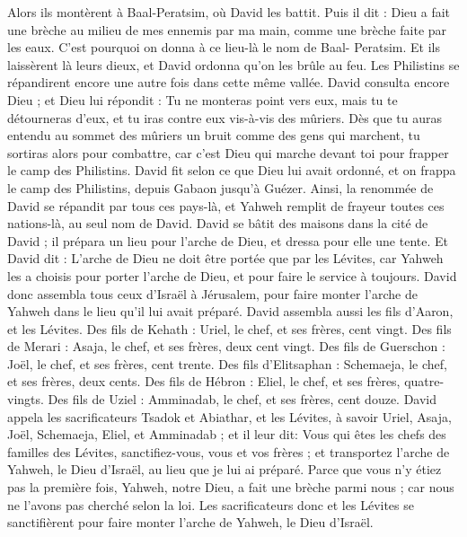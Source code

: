\begin{multicols}{2}
Alors ils montèrent à Baal-Peratsim, où David les battit. Puis il dit : Dieu a fait une brèche au milieu de mes ennemis par ma main, comme une brèche faite par les eaux. C'est pourquoi on donna à ce lieu-là le nom de Baal- Peratsim.
Et ils laissèrent là leurs dieux, et David ordonna qu'on les brûle au feu.
Les Philistins se répandirent encore une autre fois dans cette même vallée.
David consulta encore Dieu ; et Dieu lui répondit : Tu ne monteras point vers eux, mais tu te détourneras d'eux, et tu iras contre eux vis-à-vis des mûriers.
Dès que tu auras entendu au sommet des mûriers un bruit comme des gens qui marchent, tu sortiras alors pour combattre, car c’est Dieu qui marche devant toi pour frapper le camp des Philistins.
David fit selon ce que Dieu lui avait ordonné, et on frappa le camp des Philistins, depuis Gabaon jusqu'à Guézer.
Ainsi, la renommée de David se répandit par tous ces pays-là, et Yahweh remplit de frayeur toutes ces nations-là, au seul nom de David.
\VerseOne{}David se bâtit des maisons dans la cité de David ; il prépara un lieu pour l’arche de Dieu, et dressa pour elle une tente.
Et David dit : L’arche de Dieu ne doit être portée que par les Lévites, car Yahweh les a choisis pour porter l’arche de Dieu, et pour faire le service à toujours.
David donc assembla tous ceux d'Israël à Jérusalem, pour faire monter l’arche de Yahweh dans le lieu qu'il lui avait préparé.
David assembla aussi les fils d'Aaron, et les Lévites.
Des fils de Kehath : Uriel, le chef, et ses frères, cent vingt.
Des fils de Merari : Asaja, le chef, et ses frères, deux cent vingt.
Des fils de Guerschon : Joël, le chef, et ses frères, cent trente.
Des fils d'Elitsaphan : Schemaeja, le chef, et ses frères, deux cents.
Des fils de Hébron : Eliel, le chef, et ses frères, quatre-vingts.
Des fils de Uziel : Amminadab, le chef, et ses frères, cent douze.
David appela les sacrificateurs Tsadok et Abiathar, et les Lévites, à savoir Uriel, Asaja, Joël, Schemaeja, Eliel, et Amminadab ;
et il leur dit: Vous qui êtes les chefs des familles des Lévites, sanctifiez-vous, vous et vos frères ; et transportez l’arche de Yahweh, le Dieu d'Israël, au lieu que je lui ai préparé.
Parce que vous n'y étiez pas la première fois, Yahweh, notre Dieu, a fait une brèche parmi nous ; car nous ne l'avons pas cherché selon la loi.
Les sacrificateurs donc et les Lévites se sanctifièrent pour faire monter l’arche de Yahweh, le Dieu d'Israël.

\end{multicols}
